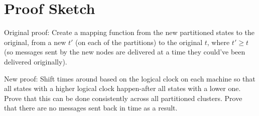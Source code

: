 \documentclass{article}
\begin{document}
\section{Proof Sketch}
Original proof: Create a mapping function from the new partitioned states to the original, from a new $t'$ (on each of the partitions) to the original $t$, where $t' \ge t$ (so messages sent by the new nodes are delivered at a time they could've been delivered originally).

New proof: Shift times around based on the logical clock on each machine so that all states with a higher logical clock happen-after all states with a lower one.
Prove that this can be done consistently across all partitioned clusters.
Prove that there are no messages sent back in time as a result.
\end{document}
